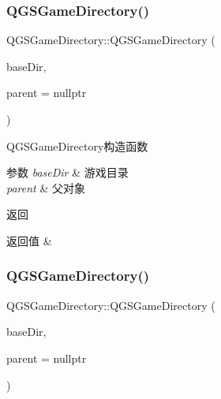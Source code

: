 \subsubsection{\texorpdfstring{Q\+G\+S\+Game\+Directory()}{QGSGameDirectory()}\hspace{0.1cm}{\footnotesize\ttfamily [1/4]}}
{\footnotesize\ttfamily Q\+G\+S\+Game\+Directory\+::\+Q\+G\+S\+Game\+Directory (\begin{DoxyParamCaption}\item[{const Q\+Dir \&}]{base\+Dir,  }\item[{Q\+Object $\ast$}]{parent = {\ttfamily nullptr} }\end{DoxyParamCaption})}



Q\+G\+S\+Game\+Directory构造函数 


\begin{DoxyParams}{参数}
{\em base\+Dir} & 游戏目录\\
\hline
{\em parent} & 父对象\\
\hline
\end{DoxyParams}
\begin{DoxyReturn}{返回}

\end{DoxyReturn}

\begin{DoxyRetVals}{返回值}
{\em } & \\
\hline
\end{DoxyRetVals}
\mbox{\label{class_q_g_s_game_directory_a1ce062aea1cbc90d891030e021df28dc}} 
\subsubsection{\texorpdfstring{Q\+G\+S\+Game\+Directory()}{QGSGameDirectory()}\hspace{0.1cm}{\footnotesize\ttfamily [2/4]}}
{\footnotesize\ttfamily Q\+G\+S\+Game\+Directory\+::\+Q\+G\+S\+Game\+Directory (\begin{DoxyParamCaption}\item[{Q\+Dir \&\&}]{base\+Dir,  }\item[{Q\+Object $\ast$}]{parent = {\ttfamily nullptr} }\end{DoxyParamCaption})}



